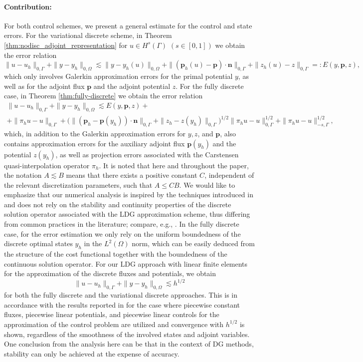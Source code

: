 \documentclass[a4paper,10pt]{article}
\newcommand{\bp}{{\mathbf{p}}}
\newcommand{\bn}{{\mathbf{n}}}
\numberwithin{theorem}{section}
\newcommand{\x}[2][blue]{#2}
\begin{document}
\paragraph*{Contribution:} For both control schemes, we present a general estimate for the control and state errors. For the variational discrete scheme, in Theorem \ref{thm:nodisc_adjoint_representation} for $u\in H^{s}(\Gamma)$ $(s\in [0,1])$ we obtain the error relation
\[\| u - u_h \|_{0,\Gamma}  + \|y-y_h\|_{0,\Omega} \lesssim \|y-y_h(u)\|_{0,\Omega} + \|(\bp_h(u) - \bp)\cdot\bn\|_{0,\Gamma} + \|z_h(u) - z\|_{0,\Gamma} =:E(y,\bp,z),\]
    which only involves Galerkin approximation errors for the primal potential $y$, as well as for the adjoint flux $\bp$ and the adjoint potential $z$.
For the fully discrete case, in Theorem \ref{thm:fully-discrete} we obtain the error relation
\begin{multline*}
    \| u - u_h \|_{0,\Gamma}  + \|y-y_h\|_{0,\Omega} \lesssim E(y,\bp,z) + \\ +\|\pi_hu-u\|_{0,\Gamma} +\big(\|(\bp_h - \bp(y_h))\cdot\bn\|_{0,\Gamma}+\|z_h - z(y_h)\|_{0,\Gamma}\big)^{1/2}\|\pi_hu-u\|_{0,\Gamma}^{1/2} + \|\pi_h u - u\|_{-s,\Gamma}^{1/2},
    \end{multline*}
    which, in addition to the Galerkin approximation errors for $y,z$, and $\bp$, also contains approximation errors for the auxiliary adjoint flux $\bp(y_h)$ and the potential $z(y_h)$, as well as projection errors associated with the Carstensen quasi-interpolation operator $\pi_h$. \x{It is noted that here and throughout the paper, the notation $A \lesssim B$ means that there exists a positive constant $C$, independent of the relevant discretization parameters, such that $A \leq C B$.} We would like to emphasize that our numerical analysis is inspired by the techniques introduced in \cite[Chapter 3]{MHinze_RPinnau_MUlbrich_SUlbrich_2009a} and does not rely on the stability and continuity properties of the discrete solution operator associated with the LDG approximation scheme, thus differing from common practices in the literature; compare, e.g., \cite{WGong_NYan_2011b,JPfefferer_BVexler_2025}. In the fully discrete case, for the error estimation we only rely on the uniform boundedness of the discrete optimal states $y_h$ in the $L^2(\Omega)$ norm, which can be easily deduced from the structure of the cost functional together with the boundedness of the continuous solution operator. For our LDG approach with \x{linear finite} elements for the approximation of the  discrete fluxes and potentials, we obtain
    \[
\| u - u_h \|_{0,\Gamma}  + \|y-y_h\|_{0,\Omega} \lesssim h^{1/2}
    \]
for both the fully discrete and the variational discrete approaches. This is in accordance with the results reported in \cite{WGong_WHu_MMateos_JSingler_XZhang_YZhang_2018} for \x{the case  where} piecewise constant fluxes, piecewise linear potentials, and piecewise linear controls for the approximation of the control problem are utilized and convergence with $h^{1/2}$ is shown, regardless of the smoothness of the involved states and adjoint variables. One conclusion from the analysis here can be that in the context of DG methods, stability can only be achieved at the expense of accuracy.
\end{document}
